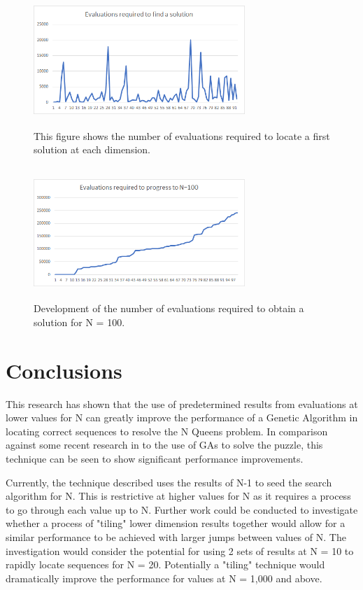 \documentclass[conference]{IEEEtran}
\begin{document}
\begin{figure}[!htbp]
	\centering	
	\includegraphics[width=8cm, height=5cm]{EvaluationsPerDimension}
	\caption{This figure shows the number of evaluations required to locate a first solution at each dimension.}
\end{figure}

\begin{figure}[!htbp]
	\centering	
	\includegraphics[width=8cm, height=5cm]{EvaluationProgress}
	\caption{Development of the number of evaluations required to obtain a solution for N = 100.}
\end{figure}

\section{Conclusions}
This research has shown that the use of predetermined results from evaluations at lower values for N can greatly improve the performance of a Genetic Algorithm in locating correct sequences to resolve the N Queens problem. In comparison against some recent research in to the use of GAs to solve the puzzle, this technique can be seen to show significant performance improvements. 

Currently, the technique described uses the results of N-1 to seed the search algorithm for N. This is restrictive at higher values for N as it requires a process to go through each value up to N. Further work could be conducted to investigate whether a process of "tiling" lower dimension results together would allow for a similar performance to be achieved with larger jumps between values of N. The investigation would consider the potential for using 2 sets of results at N = 10 to rapidly locate sequences for N = 20. Potentially a "tiling" technique would dramatically improve the performance for values at N = 1,000 and above.
\end{document}
